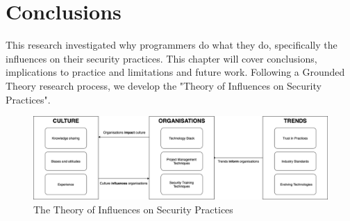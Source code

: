 \chapter{Conclusions}\label{C:Conclusions}

This research investigated why programmers do what they do, specifically the influences on their security practices. This chapter will cover conclusions, implications to practice and limitations and future work. Following a Grounded Theory research process, we develop the "Theory of Influences on Security Practices".
\newline
\par
\begin{figure}[ht]
\includegraphics[width=17cm]{figures/fig2.png}
\centering
\caption{The Theory of Influences on Security Practices}
\centering
\end{figure}

